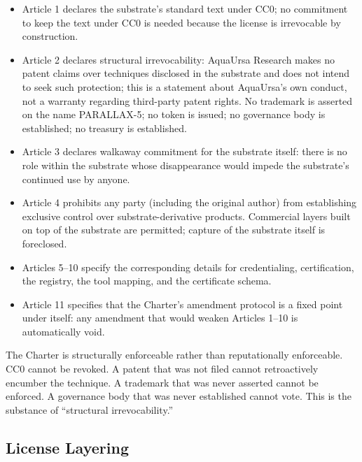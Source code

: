 \documentclass[11pt,a4paper]{article}
\begin{document}
\begin{itemize}
  \item Article 1 declares the substrate's standard text under CC0; no commitment to keep the text under CC0 is needed because the license is irrevocable by construction.
  \item Article 2 declares structural irrevocability: AquaUrsa Research makes no patent claims over techniques disclosed in the substrate and does not intend to seek such protection; this is a statement about AquaUrsa's own conduct, not a warranty regarding third-party patent rights. No trademark is asserted on the name PARALLAX-5; no token is issued; no governance body is established; no treasury is established.
  \item Article 3 declares walkaway commitment for the substrate itself: there is no role within the substrate whose disappearance would impede the substrate's continued use by anyone.
  \item Article 4 prohibits any party (including the original author) from establishing exclusive control over substrate-derivative products. Commercial layers built on top of the substrate are permitted; capture of the substrate itself is foreclosed.
  \item Articles 5--10 specify the corresponding details for credentialing, certification, the registry, the tool mapping, and the certificate schema.
  \item Article 11 specifies that the Charter's amendment protocol is a fixed point under itself: any amendment that would weaken Articles 1--10 is automatically void.
\end{itemize}

The Charter is structurally enforceable rather than reputationally enforceable. CC0 cannot be revoked. A patent that was not filed cannot retroactively encumber the technique. A trademark that was never asserted cannot be enforced. A governance body that was never established cannot vote. This is the substance of ``structural irrevocability.''

\subsection{License Layering}\label{sec:license-layering}
\end{document}
